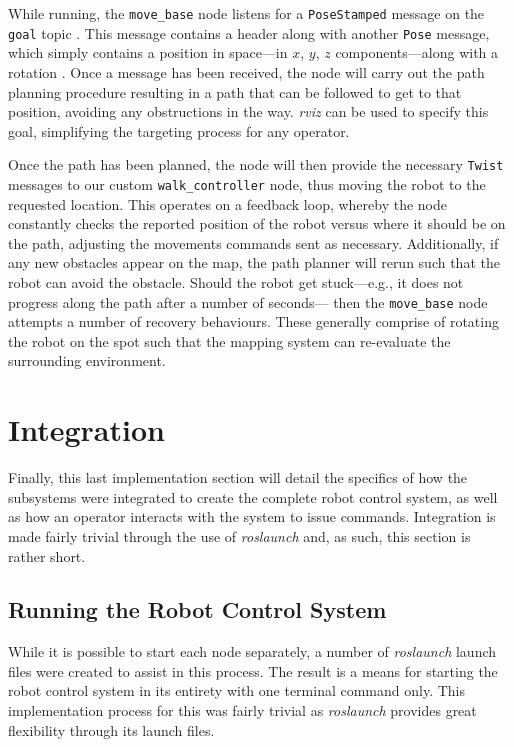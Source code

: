 While running, the \texttt{move\_base} node listens for a \texttt{PoseStamped} message on the \texttt{goal} topic \cite{ros_wiki_nav_base}. This message contains a header along with another \texttt{Pose} message, which simply contains a position in space---in $x$, $y$, $z$ components---along with a rotation \cite{ros_api_posestamped}. Once a message has been received, the node will carry out the path planning procedure resulting in a path that can be followed to get to that position, avoiding any obstructions in the way. \emph{rviz} can be used to specify this goal, simplifying the targeting process for any operator. 

Once the path has been planned, the node will then provide the necessary \texttt{Twist} messages to our custom \texttt{walk\_controller} node, thus moving the robot to the requested location. This operates on a feedback loop, whereby the node constantly checks the reported position of the robot versus where it should be on the path, adjusting the movements commands sent as necessary. Additionally, if any new obstacles appear on the map, the path planner will rerun such that the robot can avoid the obstacle. Should the robot get stuck---e.g., it does not progress along the path after a number of seconds--- then the \texttt{move\_base} node attempts a number of recovery behaviours. These generally comprise of rotating the robot on the spot such that the mapping system can re-evaluate the surrounding environment.


\section{Integration}
\label{sec:integration}

Finally, this last implementation section will detail the specifics of how the subsystems were integrated to create the complete robot control system, as well as how an operator interacts with the system to issue commands. Integration is made fairly trivial through the use of \emph{roslaunch} and, as such, this section is rather short.

\subsection{Running the Robot Control System}

While it is possible to start each node separately, a number of \emph{roslaunch} launch files were created to assist in this process. The result is a means for starting the robot control system in its entirety with one terminal command only. This implementation process for this was fairly trivial as \emph{roslaunch} provides great flexibility through its launch files.

